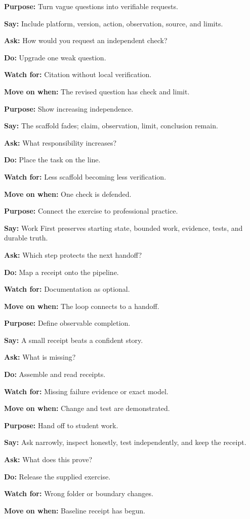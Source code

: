 \documentclass[11pt]{article}
\newcommand{\field}[2]{\textbf{\color{blue}#1:} #2\par}
\begin{document}
\field{Purpose}{Turn vague questions into verifiable requests.}\field{Say}{Include platform, version, action, observation, source, and limits.}\field{Ask}{How would you request an independent check?}\field{Do}{Upgrade one weak question.}\field{Watch for}{Citation without local verification.}\field{Move on when}{The revised question has check and limit.}
\field{Purpose}{Show increasing independence.}\field{Say}{The scaffold fades; claim, observation, limit, conclusion remain.}\field{Ask}{What responsibility increases?}\field{Do}{Place the task on the line.}\field{Watch for}{Less scaffold becoming less verification.}\field{Move on when}{One check is defended.}
\field{Purpose}{Connect the exercise to professional practice.}\field{Say}{Work First preserves starting state, bounded work, evidence, tests, and durable truth.}\field{Ask}{Which step protects the next handoff?}\field{Do}{Map a receipt onto the pipeline.}\field{Watch for}{Documentation as optional.}\field{Move on when}{The loop connects to a handoff.}
\field{Purpose}{Define observable completion.}\field{Say}{A small receipt beats a confident story.}\field{Ask}{What is missing?}\field{Do}{Assemble and read receipts.}\field{Watch for}{Missing failure evidence or exact model.}\field{Move on when}{Change and test are demonstrated.}
\field{Purpose}{Hand off to student work.}\field{Say}{Ask narrowly, inspect honestly, test independently, and keep the receipt.}\field{Ask}{What does this prove?}\field{Do}{Release the supplied exercise.}\field{Watch for}{Wrong folder or boundary changes.}\field{Move on when}{Baseline receipt has begun.}
\end{document}
